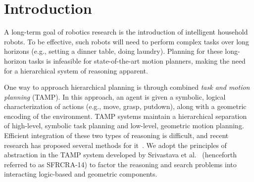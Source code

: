 \section{Introduction}
A long-term goal of robotics research is the introduction of
intelligent household robots.  To be effective, such robots will need
to perform complex tasks over long horizons (e.g., setting a dinner
table, doing laundry). Planning for these long-horizon tasks is
infeasible for state-of-the-art motion planners, making the need for a
hierarchical system of reasoning apparent.

One way to approach hierarchical planning is through combined
\emph{task and motion planning} (TAMP). In this approach, an agent is
given a symbolic, logical characterization of actions (e.g., move,
grasp, putdown), along with a geometric encoding of the
environment. TAMP systems maintain a hierarchical separation of
high-level, symbolic task planning and low-level, geometric motion
planning.  Efficient integration of these two types of reasoning is
difficult, and recent research has proposed several methods for
it~\cite{srivastava2014combined, deardenplanningtamp, kaelbling2011hierarchical,
  lagriffoul2014orientation, GarrettWAFR14, dornhege2012semantic}.
We adopt the principles of abstraction in the TAMP system developed by
Srivastava et al.~\cite{srivastava2014combined} (henceforth referred
to as SFRCRA-14) to factor the reasoning and search problems into
interacting logic-based and geometric components.

